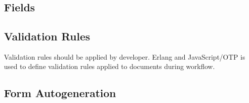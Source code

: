 \

\subsection{Fields}

\subsection{Validation Rules}
Validation rules should be applied by developer.
Erlang and JavaScript/OTP is used to define validation
rules applied to documents during workflow.

\subsection{Form Autogeneration}

